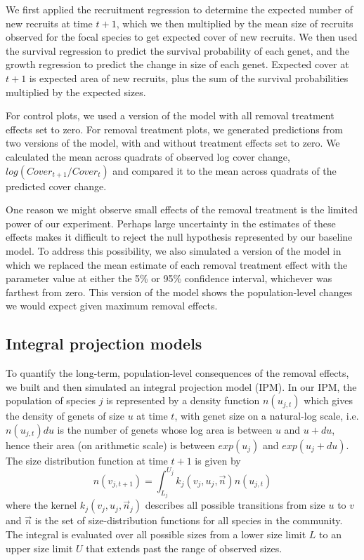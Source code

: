 \documentclass[11pt]{article}
\begin{document}
\begin{doublespacing}

We first applied the recruitment regression to determine the expected number of new recruits at time $t+1$, which we then multiplied by the mean size of recruits observed for the focal species to get expected cover of new recruits. We then used the survival regression to predict the survival probability of each genet, and the growth regression to predict the change in size of each genet. Expected cover at $t+1$ is expected area of new recruits, plus the sum of the survival probabilities multiplied by the expected sizes. 

For control plots, we used a version of the model with all removal treatment effects set to zero. For removal treatment plots, we generated predictions from two versions of the model, with and without treatment effects set to zero.  We calculated the mean across quadrats of observed log cover change, $log(Cover_{t+1}/Cover_t)$ and compared it to the mean across quadrats of the predicted cover change.

One reason we might observe small effects of the removal treatment is the limited power of our experiment. Perhaps large uncertainty in the estimates of these effects makes it difficult to reject the null hypothesis represented by our baseline model. To address this possibility, we also simulated a version of the model in which we replaced the mean estimate of each removal treatment effect with the parameter value at either the 5\% or 95\% confidence interval, whichever was farthest from zero. This version of the model shows the population-level changes we would expect given maximum removal effects.

\subsection*{Integral projection models}

To quantify the long-term, population-level consequences of the removal effects, we built and then simulated an integral projection model (IPM). In our IPM, the population of species $j$ is represented by a density function $n(u_{j,t})$ which gives the density of genets of size $u$ at time $t$, with genet size on a natural-log scale, i.e. $n(u_{j,t})du$ is the number of genets whose log area is between $u$ and $u+du$, hence their area 
(on arithmetic scale) is between $exp(u_j)$ and $exp(u_j+du)$. The size distribution function at time $t+1$ is given by
\begin{equation}
n(v_{j,t+1})=\int_{L_j}^{U_j} k_j (v_j,u_j,{\vec{n}})n(u_{j,t})   
\label{eqn:IPM}
\end{equation}
where the kernel $k_j (v_j,u_j,\vec{n}_j)$ describes all possible transitions from size $u$ to $v$ and $\vec{n}$ 
is the set of size-distribution functions for all species in the community. The integral is evaluated over all possible sizes from a 
lower size limit $L$ to an upper size limit $U$ that extends past the range of observed sizes.   


\end{doublespacing}
\end{document}
